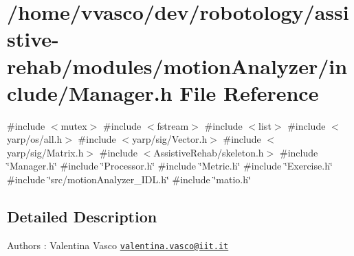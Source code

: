 \section{/home/vvasco/dev/robotology/assistive-\/rehab/modules/motion\+Analyzer/include/\+Manager.h File Reference}
\label{Manager_8h}
{\ttfamily \#include $<$mutex$>$}\newline
{\ttfamily \#include $<$fstream$>$}\newline
{\ttfamily \#include $<$list$>$}\newline
{\ttfamily \#include $<$yarp/os/all.\+h$>$}\newline
{\ttfamily \#include $<$yarp/sig/\+Vector.\+h$>$}\newline
{\ttfamily \#include $<$yarp/sig/\+Matrix.\+h$>$}\newline
{\ttfamily \#include $<$Assistive\+Rehab/skeleton.\+h$>$}\newline
{\ttfamily \#include \char`\"{}Manager.\+h\char`\"{}}\newline
{\ttfamily \#include \char`\"{}Processor.\+h\char`\"{}}\newline
{\ttfamily \#include \char`\"{}Metric.\+h\char`\"{}}\newline
{\ttfamily \#include \char`\"{}Exercise.\+h\char`\"{}}\newline
{\ttfamily \#include \char`\"{}src/motion\+Analyzer\+\_\+\+I\+D\+L.\+h\char`\"{}}\newline
{\ttfamily \#include \char`\"{}matio.\+h\char`\"{}}\newline


\subsection{Detailed Description}
\begin{DoxyAuthor}{Authors}
\+: Valentina Vasco \href{mailto:valentina.vasco@iit.it}{\tt valentina.\+vasco@iit.\+it} 
\end{DoxyAuthor}
